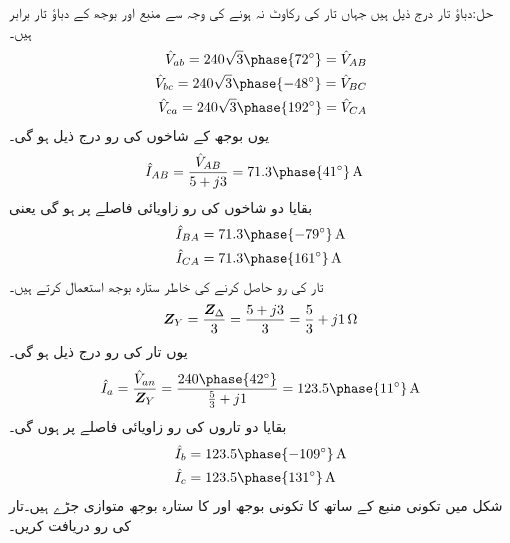 حل:دباؤ تار درج ذیل ہیں جہاں تار کی رکاوٹ نہ ہونے کی وجہ سے منبع اور بوجھ کے دباؤ تار برابر ہیں۔
\begin{align*}
\hat{V}_{ab}=240\sqrt{3}\phase{72^{\circ}}=\hat{V}_{AB}\\
\hat{V}_{bc}=240\sqrt{3}\phase{-48^{\circ}}=\hat{V}_{BC}\\
\hat{V}_{ca}=240\sqrt{3}\phase{192^{\circ}}=\hat{V}_{CA}
\end{align*}
یوں بوجھ کے شاخوں کی رو درج ذیل ہو گی۔
\begin{align*}
\hat{I}_{AB}&=\frac{\hat{V}_{AB}}{5+j3}=71.3\phase{41^{\circ}}\,\si{\ampere}
\end{align*}
بقایا دو شاخوں کی رو  زاویائی فاصلے پر ہو گی یعنی
\begin{align*}
\hat{I}_{BA}&=71.3\phase{-79^{\circ}}\,\si{\ampere}\\
\hat{I}_{CA}&=71.3\phase{161^{\circ}}\,\si{\ampere}
\end{align*}
تار کی رو حاصل کرنے کی خاطر ستارہ بوجھ استعمال کرتے ہیں۔
\begin{align*}
{\ensuremath{{\boldsymbol{Z}}}}_{Y}=\frac{{{\boldsymbol{Z}}}_{\Delta}}{3}=\frac{5+j3}{3}=\frac{5}{3}+j1\,\si{\ohm}
\end{align*}
یوں تار کی رو درج ذیل ہو گی۔
\begin{align*}
\hat{I}_a=\frac{\hat{V}_{an}}{\bZ_{Y}}=\frac{240\phase{42^{\circ}}}{\frac{5}{3}+j1}=123.5\phase{11^{\circ}}\,\si{\ampere}
\end{align*}
بقایا دو تاروں کی رو  زاویائی فاصلے پر ہوں گی۔
\begin{align*}
\hat{I}_b&=123.5\phase{-109^{\circ}}\,\si{\ampere}\\
\hat{I}_c&=123.5\phase{131^{\circ}}\,\si{\ampere}\\
\end{align*}
شکل  میں تکونی منبع کے ساتھ  کا تکونی بوجھ اور  کا ستارہ بوجھ متوازی جڑے ہیں۔تار کی رو دریافت کریں۔
